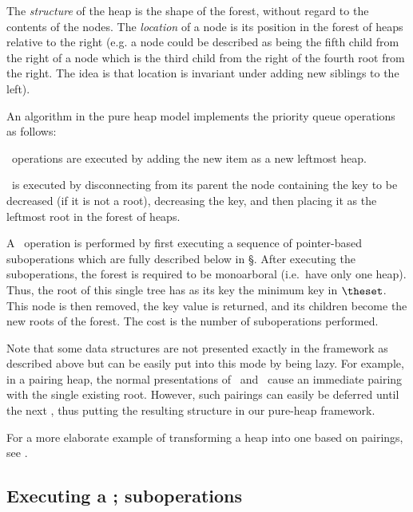 The \emph{structure} of the heap is the shape of the forest, without regard to the contents of the nodes. The \emph{location} of a node is its position in the forest of heaps relative to the right (e.g. a node could be described as being the fifth child from the right of a node which is the third child from the right of the fourth root from the right. The idea is that location is invariant under adding new siblings to the left).

An algorithm in the pure heap model implements the priority queue operations as follows:
\shortfull{}\item \opIns\ operations are executed by adding the new item as a new leftmost heap. 
\shortfull{}\item \opDc\ is executed  by disconnecting from its parent the node containing the key to be decreased (if it is not a root), decreasing the key, and then placing it as the leftmost root in the forest of heaps. 
\shortfull{}\item A \opEm\ operation is performed by first executing a sequence of pointer-based suboperations which are fully described below in \S{}. After executing the suboperations, the forest is required to be monoarboral (i.e.~have only one heap). 
Thus, the root of this single tree has as its key the minimum key in $\theset$. This node is then removed, the key value is returned, and its children become the new roots of the forest. The cost is the number of suboperations performed. 


Note that some data structures are not presented exactly in the framework as described above but can be easily put into this mode by being lazy. For example, in a pairing heap, the normal presentations of \opIns\ and \opDc\ cause an immediate pairing with the single existing root. However, such pairings can easily be deferred until the next \opEm, thus putting the resulting structure in our pure-heap framework. 
\begin{fullonly}
For a more elaborate example of transforming a heap into one based on pairings, see \cite{DBLP:conf/wae/Fredman99}.
\end{fullonly}




\subsection{Executing a \opEm; suboperations} 

